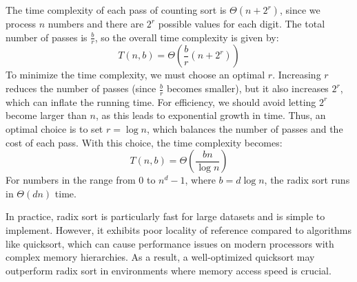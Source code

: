 The time complexity of each pass of counting sort is $\Theta(n + 2^r)$, since we process $n$ numbers and there are $2^r$ possible values for each digit.
The total number of passes is $\frac{b}{r}$, so the overall time complexity is given by:
\[T(n,b)=\Theta\left(\dfrac{b}{r}(n+2^r)\right)\]
To minimize the time complexity, we must choose an optimal $r$.
Increasing $r$ reduces the number of passes (since $\frac{b}{r}$ becomes smaller), but it also increases $2^r$, which can inflate the running time.
For efficiency, we should avoid letting $2^r$ become larger than $n$, as this leads to exponential growth in time.
Thus, an optimal choice is to set $r=\log n$, which balances the number of passes and the cost of each pass. 
With this choice, the time complexity becomes:
\[T(n,b)=\Theta\left(\dfrac{bn}{\log n}\right)\]
For numbers in the range from $0$ to $n^d-1$, where $b=d\log n$, the radix sort runs in $\Theta(dn)$ time. 

In practice, radix sort is particularly fast for large datasets and is simple to implement. 
However, it exhibits poor locality of reference compared to algorithms like quicksort, which can cause performance issues on modern processors with complex memory hierarchies. 
As a result, a well-optimized quicksort may outperform radix sort in environments where memory access speed is crucial.